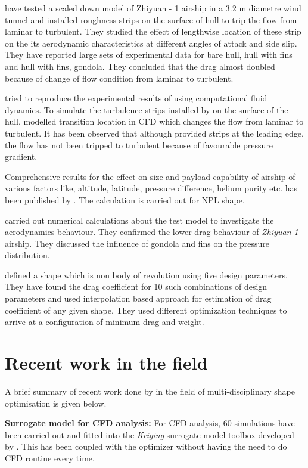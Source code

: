 \cite{Wang2010} have tested a scaled down model of Zhiyuan - 1 airship in a 3.2 m diametre wind tunnel and installed roughness strips on the surface of hull to trip the flow from laminar to turbulent. They studied the effect of lengthwise location of these strip on the its aerodynamic characteristics at different angles of attack and side slip. They have reported large sets of experimental data for bare hull, hull with fins and hull with fins, gondola. They concluded  that the drag almost doubled because of change of flow condition from laminar to turbulent.

\cite{Suman2011} tried to reproduce the experimental results of \cite{Wang2010} using computational fluid dynamics. To simulate the turbulence strips installed by  \cite{Wang2010} on the surface of the hull, \cite{Suman2011} modelled transition location in CFD which changes the flow from laminar to turbulent. It has been observed that although \cite{Wang2010} provided strips at the leading edge, the flow has not been tripped to turbulent because of favourable pressure gradient.

Comprehensive results for the effect on size and payload capability of airship of various factors like, altitude, latitude, pressure difference, helium purity etc. has been published by \cite{Chen2010}. The calculation is carried out for NPL shape.


\cite{Liu2013c} carried out numerical calculations about the test model to investigate the aerodynamics behaviour. They confirmed the lower drag behaviour of \textit{Zhiyuan-1} airship. They discussed the influence of gondola and fins on the pressure distribution.

\cite{Ceruti2013b} defined a shape which is non body of revolution using five design parameters. They have found the drag coefficient for 10 such combinations of design parameters and used interpolation based approach for estimation of drag coefficient of any given shape. They used different optimization techniques to arrive at a configuration of minimum drag and weight. 


\section{Recent work in the field}

A brief summary of recent work done by \cite{alam2017thesis} in the field of multi-disciplinary shape optimisation is given below. 

\textbf{Surrogate model for CFD analysis:}
For CFD analysis, 60 simulations have been carried out and fitted into the \textit{Kriging} surrogate model toolbox developed by \cite{viana2014metamodeling}. This has been coupled with the optimizer without having the need to do CFD routine every time.

